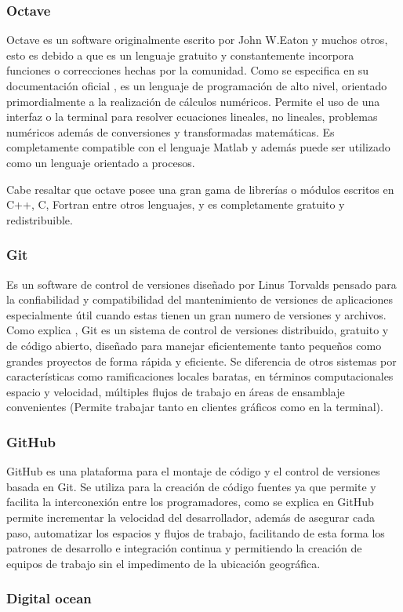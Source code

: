 \subsubsection{Octave}
Octave es un software originalmente escrito por John W.Eaton y muchos otros,
esto es debido a que es un lenguaje gratuito y constantemente incorpora
funciones o correcciones hechas por la comunidad. Como se especifica en su
documentación oficial \cite{octave}, es un lenguaje de programación de alto
nivel, orientado primordialmente a la realización de cálculos numéricos.
Permite el uso de una interfaz  o la terminal para resolver ecuaciones
lineales, no lineales, problemas numéricos además de conversiones y
transformadas matemáticas. Es completamente compatible con el lenguaje Matlab y
además puede ser utilizado como un lenguaje orientado a procesos.

Cabe resaltar que octave posee una gran gama de librerías o módulos escritos en
C++, C, Fortran entre otros lenguajes, y es completamente gratuito y
redistribuible.


\subsubsection{Git}
Es un software de control de versiones diseñado por Linus Torvalds pensado para
la confiabilidad y compatibilidad del mantenimiento de versiones de aplicaciones
especialmente útil cuando estas tienen un gran numero de versiones y archivos.
Como explica \cite{Git}, Git es un sistema de control de versiones distribuido,
gratuito y de código abierto, diseñado para manejar eficientemente tanto pequeños
como grandes proyectos de forma rápida y eficiente. Se diferencia de otros sistemas
por características como ramificaciones locales baratas, en términos computacionales
espacio y velocidad, múltiples flujos de trabajo en áreas de ensamblaje convenientes
(Permite trabajar tanto en clientes gráficos como en la terminal).

\subsubsection{GitHub}
GitHub es una plataforma para el montaje de  código y el control de versiones
basada en Git. Se utiliza para la creación de código fuentes ya que permite y
facilita la interconexión entre los programadores, como se explica en \cite{github}
GitHub  permite incrementar la velocidad del desarrollador, además de asegurar
cada paso, automatizar los espacios y flujos de trabajo, facilitando de esta
forma los patrones de desarrollo e integración continua y permitiendo la creación
de equipos de trabajo sin el impedimento de la ubicación geográfica.

\subsubsection{Digital ocean}
